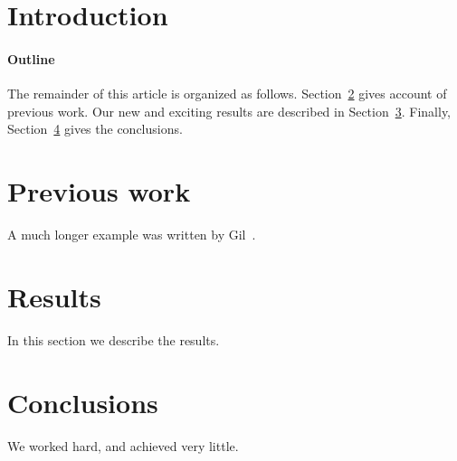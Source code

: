 \documentclass[12pt]{article}
\begin{document}
\maketitle

\section{Introduction}


\paragraph{Outline}
The remainder of this article is organized as follows.
Section~\ref{previous work} gives account of previous work.
Our new and exciting results are described in Section~\ref{results}.
Finally, Section~\ref{conclusions} gives the conclusions.

\section{Previous work}\label{previous work}
A much longer \LaTeXe{} example was written by Gil~\cite{Gil:02}.

\section{Results}\label{results}
In this section we describe the results.

\section{Conclusions}\label{conclusions}
We worked hard, and achieved very little.



\end{document}
